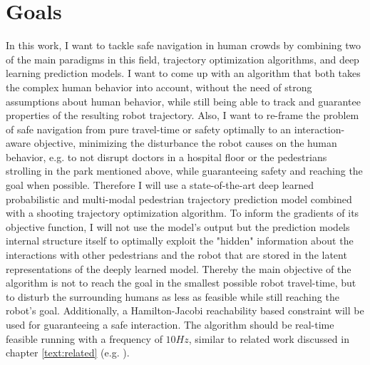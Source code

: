 \section{Goals}
\label{text:introduction/goals}
In this work, I want to tackle safe navigation in human crowds by combining two of the main paradigms in this field, trajectory optimization algorithms, and deep learning prediction models. I want to come up with an algorithm that both takes the complex human behavior into account, without the need of strong assumptions about human behavior, while still being able to track and guarantee properties of the resulting robot trajectory. Also, I want to re-frame the problem of safe navigation from pure travel-time or safety optimally to an interaction-aware objective, minimizing the disturbance the robot causes on the human behavior, e.g. to not disrupt doctors in a hospital floor or the pedestrians strolling in the park mentioned above, while guaranteeing safety and reaching the goal when possible.
\newline
Therefore I will use a state-of-the-art deep learned probabilistic and multi-modal pedestrian trajectory prediction model combined with a shooting trajectory optimization algorithm. To inform the gradients of its objective function, I will not use the model's output but the prediction models internal structure itself to optimally exploit the "hidden" information about the interactions with other pedestrians and the robot that are stored in the latent representations of the deeply learned model. Thereby the main objective of the algorithm is not to reach the goal in the smallest possible robot travel-time, but to disturb the surrounding humans as less as feasible while still reaching the robot's goal. Additionally, a Hamilton-Jacobi reachability based constraint will be used for guaranteeing a safe interaction. The algorithm should be real-time feasible running with a frequency of $10 Hz$, similar to related work discussed in chapter \ref{text:related} (e.g. \cite{Chen2017}).
